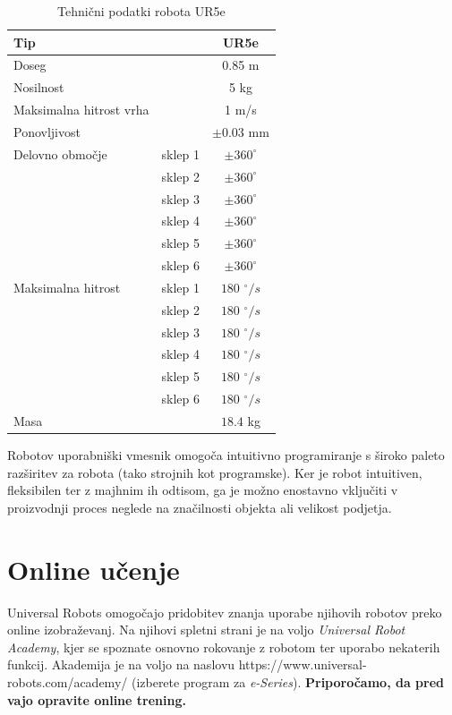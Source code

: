 \begin{table}
\begin{center}
\caption{Tehnični podatki robota UR5e}
\label{tab:ur_osnovni}
\begin{tabular}{|lr|c|}
\hline Tip &  & UR5e \\
\hline Doseg & & 0.85 m \\
\hline Nosilnost & & 5 kg \\
\hline Maksimalna hitrost vrha & & 1 m/s \\
\hline Ponovljivost & & $\pm 0.03$ mm \\
\hline Delovno območje
     & sklep 1 & $\pm 360^\circ$ \\
     & sklep 2 & $\pm 360^\circ$ \\
     & sklep 3 & $\pm 360^\circ$ \\
     & sklep 4 & $\pm 360^\circ$ \\
     & sklep 5 & $\pm 360^\circ$ \\
     & sklep 6 & $\pm 360^\circ$ \\
\hline Maksimalna hitrost
     & sklep 1 & $180$ $^\circ/s$ \\
     & sklep 2 & $180$ $^\circ/s$ \\
     & sklep 3 & $180$ $^\circ/s$ \\
     & sklep 4 & $180$ $^\circ/s$ \\
     & sklep 5 & $180$ $^\circ/s$ \\
     & sklep 6 & $180$ $^\circ/s$ \\
\hline   Masa &  & $18.4$ kg \\
\hline
\end{tabular}
\end{center}
\end{table}

Robotov uporabniški vmesnik omogoča intuitivno programiranje s široko paleto razširitev za robota (tako strojnih kot programske). Ker je robot intuitiven, fleksibilen ter z majhnim ih odtisom, ga je možno enostavno vključiti v proizvodnji proces neglede na značilnosti objekta ali velikost podjetja.

\section{Online učenje}

Universal Robots omogočajo pridobitev znanja uporabe njihovih robotov preko online izobraževanj. Na njihovi spletni strani je na voljo \emph{Universal Robot Academy}, kjer se spoznate osnovno rokovanje z robotom ter uporabo nekaterih funkcij. Akademija je na voljo na naslovu https://www.universal-robots.com/academy/ (izberete program za \emph{e-Series}).  \textbf{Priporočamo, da pred vajo opravite online trening.}


